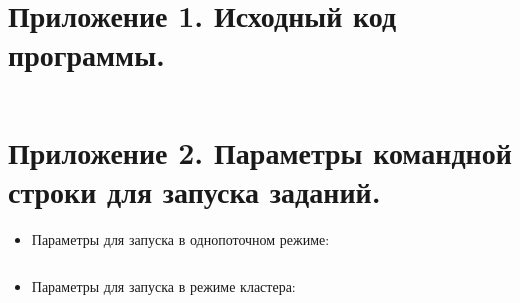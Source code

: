 \documentclass[12pt,a4paper]{report}
\begin{document}
\newpage
{}

\section{Приложение 1. Исходный код программы.}

\inputminted[fontsize=\footnotesize]{python}{../look_alike.py}

\section{Приложение 2. Параметры командной строки для запуска заданий.}

\begin{itemize}
\item Параметры для запуска в однопоточном режиме:
\inputminted[fontsize=\footnotesize]{text}{submit-local.txt}
\item Параметры для запуска в режиме кластера:
\inputminted[fontsize=\footnotesize]{text}{submit-cluster.txt}
\end{itemize}
\end{document}
